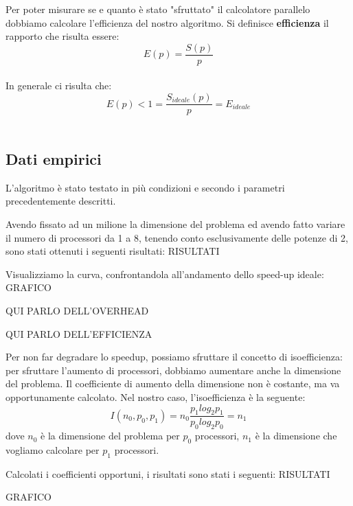 \documentclass{article}
\begin{document}
Per poter misurare se e quanto è stato "sfruttato" il calcolatore parallelo dobbiamo calcolare l'efficienza del nostro algoritmo.
Si definisce \textbf{efficienza} il rapporto che risulta essere: $$ E(p) = \frac{S(p)}{p} $$\\
In generale ci risulta che: $$ E(p) < 1 = \frac{S_{ideale}(p)}{p} = E_{ideale} $$\\


\subsection{Dati empirici}
L'algoritmo è stato testato in più condizioni e secondo i parametri precedentemente descritti.

Avendo fissato ad un milione la dimensione del problema ed avendo fatto variare il numero di processori da 1 a 8, tenendo conto esclusivamente delle potenze di 2, sono stati ottenuti i seguenti risultati:
RISULTATI

Visualizziamo la curva, confrontandola all'andamento dello speed-up ideale:
GRAFICO

QUI PARLO DELL'OVERHEAD

QUI PARLO DELL'EFFICIENZA

Per non far degradare lo speedup, possiamo sfruttare il concetto di isoefficienza: per sfruttare l'aumento di processori, dobbiamo aumentare anche la dimensione del problema. Il coefficiente di aumento della dimensione non è costante, ma va opportunamente calcolato. Nel nostro caso, l'isoefficienza è la seguente:
$$I(n_{0}, p_{0}, p_{1}) = n_0\frac{p_{1} log_{2} p_{1}}{p_{0} log_{2} p_{0}} = n_1$$
dove $n_0$ è la dimensione del problema per $p_0$ processori, $n_1$ è la dimensione che vogliamo calcolare per $p_1$ processori.

Calcolati i coefficienti opportuni, i risultati sono stati i seguenti:
RISULTATI

GRAFICO
\end{document}
